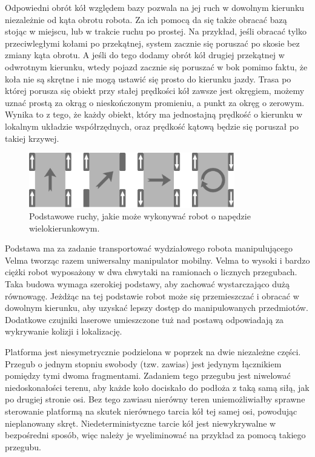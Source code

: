 Odpowiedni obrót kół względem bazy pozwala na jej ruch w dowolnym kierunku niezależnie od kąta obrotu robota.
Za ich pomocą da się także obracać bazą stojąc w miejscu, lub w trakcie ruchu po prostej.
Na przykład, jeśli obracać tylko przeciwległymi kołami po przekątnej, system zacznie się poruszać po skosie bez zmiany kąta obrotu.
A jeśli do tego dodamy obrót kół drugiej przekątnej w odwrotnym kierunku, wtedy pojazd zacznie się poruszać w bok pomimo faktu, że koła nie są skrętne i nie mogą ustawić się prosto do kierunku jazdy.
Trasa po której porusza się obiekt przy stałej prędkości kół zawsze jest okręgiem, możemy uznać prostą za okrąg o nieskończonym promieniu, a punkt za okręg o zerowym.
Wynika to z tego, że każdy obiekt, który ma jednostajną prędkość o kierunku w lokalnym układzie współrzędnych, oraz prędkość kątową będzie się poruszał po takiej krzywej.

\begin{figure}[H]
\centering
 \includegraphics[width=0.8\textwidth]{graphics/mecanum_dirs.pdf}
\caption{Podstawowe ruchy, jakie może wykonywać robot o napędzie wielokierunkowym.}
\end{figure} 

Podstawa ma za zadanie transportować wydziałowego robota manipulującego Velma tworząc razem uniwersalny manipulator mobilny.
Velma to wysoki i bardzo ciężki robot wyposażony w dwa chwytaki na ramionach o licznych przegubach.
Taka budowa wymaga szerokiej podstawy, aby zachować wystarczająco dużą równowagę.
Jeżdżąc na tej podstawie robot może się przemieszczać i obracać w dowolnym kierunku, aby uzyskać lepszy dostęp do manipulowanych przedmiotów.
Dodatkowe czujniki laserowe umieszczone tuż nad postawą odpowiadają za wykrywanie kolizji i lokalizację.

Platforma jest niesymetrycznie podzielona w poprzek na dwie niezależne części.
Przegub o jednym stopniu swobody (tzw. zawias) jest jedynym łącznikiem pomiędzy tymi dwoma fragmentami.
Zadaniem tego przegubu jest niwelować niedoskonałości terenu, aby każde koło dociskało do podłoża z taką samą siłą, jak po drugiej stronie osi.
Bez tego zawiasu nierówny teren uniemożliwiałby sprawne sterowanie platformą na skutek nierównego tarcia kół tej samej osi, powodując nieplanowany skręt.
Niedeterministyczne tarcie kół jest niewykrywalne w bezpośredni sposób, więc należy je wyeliminować na przykład za pomocą takiego przegubu.

